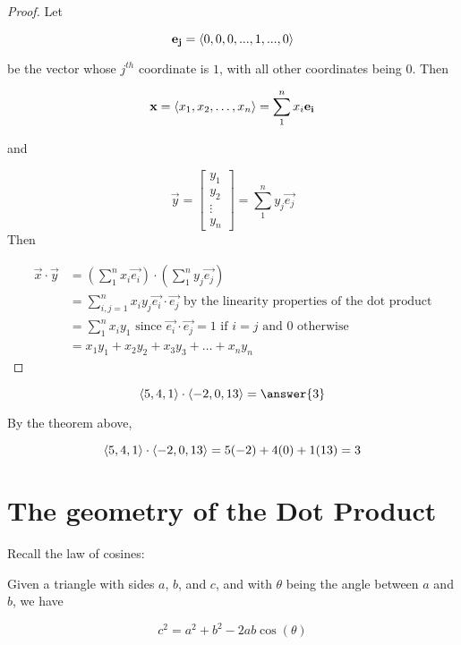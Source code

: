 \documentclass{ximera}
\begin{document}
\begin{proof}
	Let 
	
	\[
	\mathbf{e_j} = \left\langle 0,0,0,...,1,...,0\right\rangle
	\]
	
	be the vector whose $j^{th}$ coordinate is $1$, with all other coordinates being $0$.  Then
	
	\[ 
	\mathbf{x} =\left\langle x_1,x_2, \dots,x_n\right\rangle = \sum_1^n x_i \mathbf{e_i}
	\]
	
	 and
	 
	\[ 
	\vec{y} = \begin{bmatrix}y_1\\y_2\\\vdots\\y_n\end{bmatrix} = \sum_1^n y_j \vec{e_j}
	\]	 
	 Then
	 
	\begin{align*}
		\vec{x} \cdot \vec{y} &= (\sum_1^n x_i \vec{e_i}) \cdot (\sum_1^n y_j \vec{e_j})\\
			&=\sum_{i,j =1}^n x_iy_j \vec{e_i} \cdot \vec{e_j} \textrm{ by the linearity properties of the dot product}\\
			&=\sum_{1}^n x_iy_1 \textrm{ since $\vec{e_i} \cdot \vec{e_j} = 1$ if $i=j$ and $0$ otherwise}\\
			&=x_1y_1+x_2y_2+x_3y_3+\dots + x_ny_n
	\end{align*}
\end{proof}

\begin{question}
	\[
	\vector{5 , 4 , 1} \cdot \vector{-2 , 0 , 13} = \answer{3} 
	\]
	\begin{hint}
		By the theorem above, 
		
		\[
		\left\langle 5 , 4 , 1\right\rangle \cdot \left\langle -2 , 0 , 13\right\rangle= 5(-2)+4(0)+1(13) = 3
		\]
	\end{hint}
\end{question}

\section{The geometry of the Dot Product}

Recall the law of cosines:

\begin{theorem}
	Given a triangle with sides $a$, $b$, and $c$, and with $\theta$ being the angle between $a$ and $b$, we have
	
	\[
	c^2 = a^2+b^2-2ab\cos(\theta)
	\]
\end{theorem}
\end{document}
